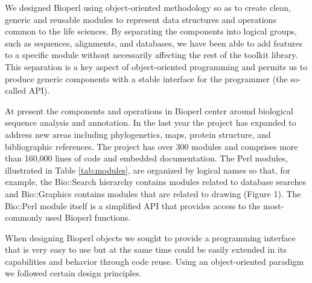 \documentclass[12pt]{article}
\begin{document}
We designed Bioperl using object-oriented methodology so as to create
clean, generic and reusable modules to represent data structures and
operations common to the life sciences.  By separating the components
into logical groups, such as sequences, alignments, and databases, we
have been able to add features to a specific module without
necessarily affecting the rest of the toolkit library.  This
separation is a key aspect of object-oriented programming and permits
us to produce generic components with a stable interface for the
programmer (the so-called API).

At present the components and operations in Bioperl center around
biological sequence analysis and annotation.  In the last year the
project has expanded to address new areas including phylogenetics,
maps, protein structure, and bibliographic references.  The project
has over 300 modules and comprises more than 160,000 lines of code and
embedded documentation.  The Perl modules, illustrated in Table
\ref{tab:modules}, are organized by logical names so that, for
example, the Bio::Search hierarchy contains modules related to
database searches and Bio::Graphics contains modules that are related
to drawing (Figure 1).  The Bio::Perl module itself is a simplified
API that provides access to the most-commonly used Bioperl functions.

When designing Bioperl objects we sought to provide a
programming interface that is very easy to use but at the same
time could be easily extended in its capabilities and behavior through
code reuse.  Using an object-oriented paradigm we followed certain
design principles.
\end{document}
